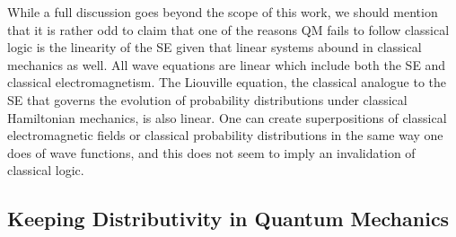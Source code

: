 \documentclass[11pt, executivepaper]{article}
\begin{document}
While a full discussion goes beyond the scope of this work, we should mention that it is rather odd to claim that one of the reasons QM fails to follow classical logic is the linearity of the SE given that linear systems abound in classical mechanics as well. All wave equations are linear which include both the SE and classical electromagnetism. The Liouville equation, the classical analogue to the SE that governs the evolution of probability distributions under classical Hamiltonian mechanics, is also linear. One can create superpositions of classical electromagnetic fields or classical probability distributions in the same way one does of wave functions, and this does not seem to imply an invalidation of classical logic.

\subsection{Keeping Distributivity in Quantum Mechanics}
\end{document}
